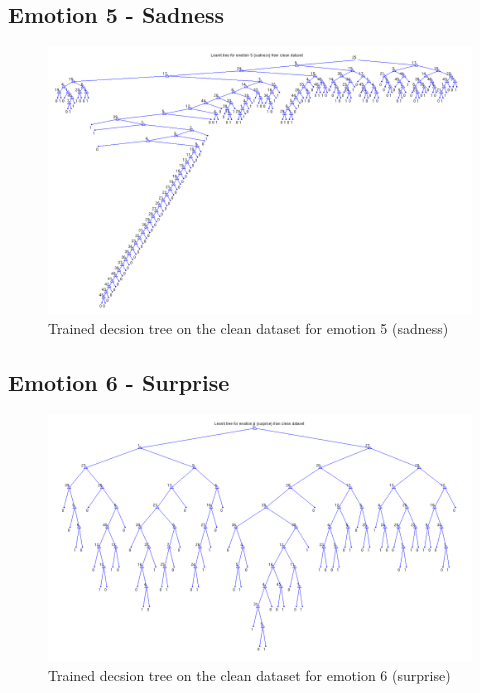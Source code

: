 \documentclass[a4paper]{article}
\begin{document}
\subsection{Emotion 5 - Sadness}
\begin{figure}[H]
\center
\includegraphics[width=0.9\columnwidth]{SadnessTree} %
\caption{Trained decsion tree on the clean dataset for emotion 5 (sadness)}
\end{figure}

\bigskip\bigskip\bigskip\bigskip\bigskip\bigskip
\subsection{Emotion 6 - Surprise}
\begin{figure}[H]
\center
\includegraphics[width=0.9\columnwidth]{SurpriseTree} %
\caption{Trained decsion tree on the clean dataset for emotion 6 (surprise)}
\end{figure}

\clearpage

\end{document}
